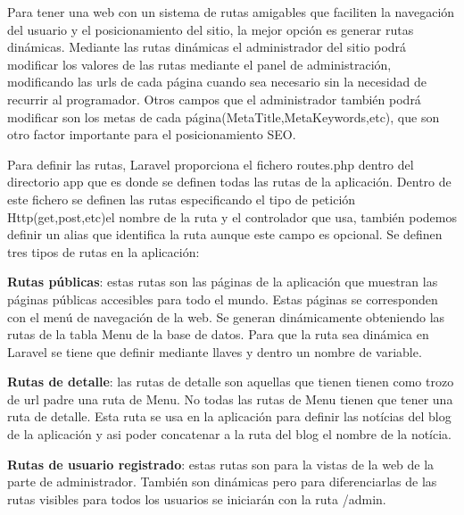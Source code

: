 Para tener una web con un sistema de rutas amigables que faciliten la navegación del usuario y el posicionamiento del sitio, la mejor opción es generar
rutas dinámicas. Mediante las rutas dinámicas el administrador del sitio podrá modificar los valores de las rutas mediante el panel de administración,
modificando las urls de cada página cuando sea necesario sin la necesidad de recurrir al programador. Otros campos que el administrador también podrá
modificar son los metas de cada página(MetaTitle,MetaKeywords,etc), que son otro factor importante para el posicionamiento SEO.

\vspace{5 mm}

Para definir las rutas, Laravel proporciona el fichero routes.php dentro del directorio app que es donde se definen todas las rutas de la aplicación.
Dentro de este fichero se definen las rutas especificando el tipo de petición Http(get,post,etc)el nombre de la ruta y el controlador que usa, también
podemos definir un alias que identifica la ruta aunque este campo es opcional. Se definen tres tipos de rutas en la aplicación:

\begin{description}

\item \textbf{Rutas públicas}: estas rutas son las páginas de la aplicación que muestran las páginas públicas accesibles para todo el mundo.
Estas páginas se corresponden con el menú de navegación de la web. Se generan dinámicamente obteniendo las rutas de la tabla Menu de la base de datos.
Para que la ruta sea dinámica en Laravel se tiene que definir mediante llaves y dentro un nombre de variable.

\item \textbf{Rutas de detalle}: las rutas de detalle son aquellas que tienen tienen como trozo de url padre una ruta de Menu. No todas las rutas de Menu
tienen que tener una ruta de detalle. Esta ruta se usa en la aplicación para definir las notícias del blog de la aplicación y asi poder concatenar a la
ruta del blog el nombre de la notícia.

\item \textbf{Rutas de usuario registrado}: estas rutas son para la vistas de la web de la parte de administrador. También son dinámicas pero para diferenciarlas de las rutas visibles para todos los usuarios se iniciarán con la ruta /admin.

\end{description}


